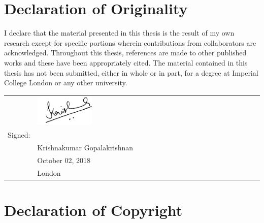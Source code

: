 
\chapter*{Declaration of Originality \hfill}

\vspace*{-1.0cm}

I declare  that the material presented  in this thesis  is the result of  my own
research except  for specific portions wherein  contributions from collaborators
are acknowledged. Throughout this thesis, references are made to other published
works and  these have been appropriately  cited. The material contained  in this
thesis has  not been  submitted, either  in whole or  in part,  for a  degree at
Imperial College London or any other university.\\[-3em]

\begin{flushright}
        \begin{tabular}{@{}p{.4in}p{2.1in}@{}}
            & \includegraphics[angle=-5,width=0.25\textwidth]{black_ink_sign_from_jpg}\\[-2em]
            Signed: & \hrulefill \\
                    & Krishnakumar Gopalakrishnan \\
                    & October 02, 2018\\
                    & London \\
        \end{tabular}
\end{flushright}

{\let\clearpage\relax \chapter*{Declaration of Copyright\hfill}}

\vspace*{-1cm}

